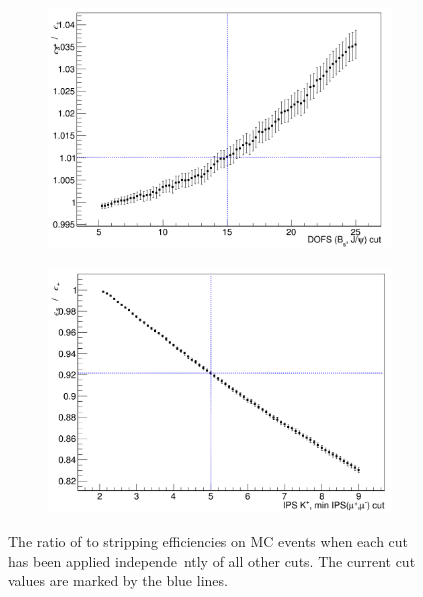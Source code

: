\begin{figure}
    \begin{subfigure}[b]{0.4\textwidth}
        \includegraphics[width=\textwidth]{./Figs/Selection/DOFS.png}
        \caption{ }
        \label{fig:FD_ratioKPi}
    \end{subfigure}
   \begin{subfigure}[b]{0.4\textwidth}
        \includegraphics[width=\textwidth]{./Figs/Selection/daug_IPS.png}
        \caption{ }
        \label{fig:IPS_ratioKPi}
    \end{subfigure}
    \caption{The ratio of \bsmumu to \bdkpi stripping efficiencies on MC events when each cut has been applied independe\
ntly of all other cuts. The current cut values are marked by the blue lines.}
    \label{fig:ratio_plotsBd2KPi}
\end{figure}

